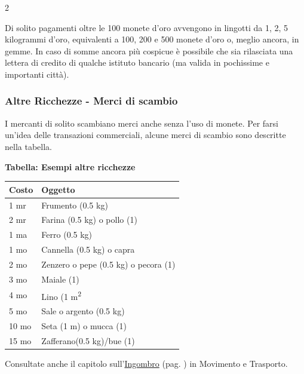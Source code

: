 \begin{multicols}{2}
\medskip

Di solito pagamenti oltre le 100 monete d'oro avvengono in lingotti da 1, 2, 5 kilogrammi d'oro, equivalenti a 100, 200 e 500 monete d'oro o, meglio ancora, in gemme. In caso di somme ancora più cospicue è possibile che sia rilasciata una lettera di credito di qualche istituto bancario (ma valida in pochissime e importanti città).

\subsubsection{Altre Ricchezze - Merci di scambio}

I mercanti di solito scambiano merci anche senza l'uso di monete.
Per farsi un'idea delle transazioni commerciali, alcune merci di scambio sono descritte nella tabella.

\medskip

\textbf{Tabella: Esempi altre ricchezze}

\medskip

\noindent\begin{tabularx}{1\linewidth}{Xl}
	\toprule
\rowcolor{gray!20}\textbf{Costo} & \textbf{Oggetto}\\
\toprule
1 mr & Frumento (0.5 kg)\\
\rowcolor{gray!20}2 mr & Farina (0.5 kg) o pollo (1)\\
1 ma & Ferro (0.5 kg)\\
\rowcolor{gray!20}1 mo & Cannella (0.5 kg) o capra \\
2 mo & Zenzero o pepe (0.5 kg) o pecora (1)\\
\rowcolor{gray!20}3 mo & Maiale (1) \\
4 mo & Lino (1 m\textsuperscript{2}\\
\rowcolor{gray!20}5 mo & Sale o argento (0.5 kg) \\
10 mo& Seta (1 m) o mucca (1)\\
\rowcolor{gray!20}15 mo& Zafferano(0.5 kg)/bue (1)
\end{tabularx}

\medskip

Consultate anche il capitolo sull'\hyperlink{ingombro}{Ingombro} (pag. \pageref{ingombro}) in Movimento e Trasporto.

\end{multicols}

\pagebreak

